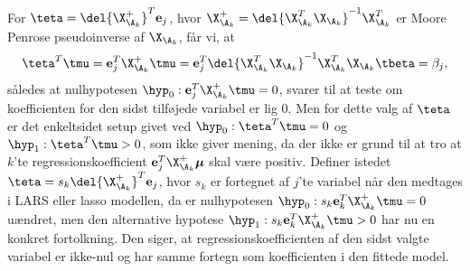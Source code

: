 For \(\teta = \del{\X_{\A_k}^+}^T \mathbf{e}_j\), hvor \(\X_{\A_k}^+= \del{\X_{\A_k}^T \X_{\A_k}}^{-1} \X_{\A_k}^T\) er Moore Penrose pseudoinverse af \(\X_{\A_k}\), får vi, at
\begin{align*}
\teta^T \tmu = \mathbf{e}_j^T \X_{\A_k}^+ \tmu =  \mathbf{e}_j^T \del{\X_{\A_k}^T \X_{\A_k}}^{-1} \X_{\A_k}^T \X_{\A_k} \tbeta = \beta_j ,
\end{align*}
således at nulhypotesen \(\hyp_0: \mathbf{e}_j^T \X_{\A_k}^+ \tmu= 0\), svarer til at teste om koefficienten for den sidst tilføjede variabel er lig 0.
Men for dette valg af \(\teta\) er det enkeltsidet setup givet ved \(\hyp_0: \teta^T \tmu = 0\) og  \(\hyp_1: \teta^T \tmu > 0\), som ikke giver mening, da der ikke er grund til at tro at \(k\)'te regressionskoefficient \(\mathbf{e}_j^T \X_{\A_k}^+ \boldsymbol{\mu}\) skal være positiv.
Definer istedet \(\teta = s_k \del{\X_{\A_k}^+}^T \mathbf{e}_j\), hvor \(s_k\) er fortegnet af \(j\)'te variabel når den medtages i LARS eller lasso modellen, da er nulhypotesen \(\hyp_0: s_k \mathbf{e}_k^T \X_{\A_k}^+ \tmu = 0\) uændret, men den alternative hypotese \(\hyp_1: s_k \mathbf{e}_k^T \X_{\A_k}^+ \tmu > 0\) har nu en konkret fortolkning.
Den siger, at regressionskoefficienten af den sidst valgte variabel er ikke-nul og har samme fortegn som koefficienten i den fittede model.